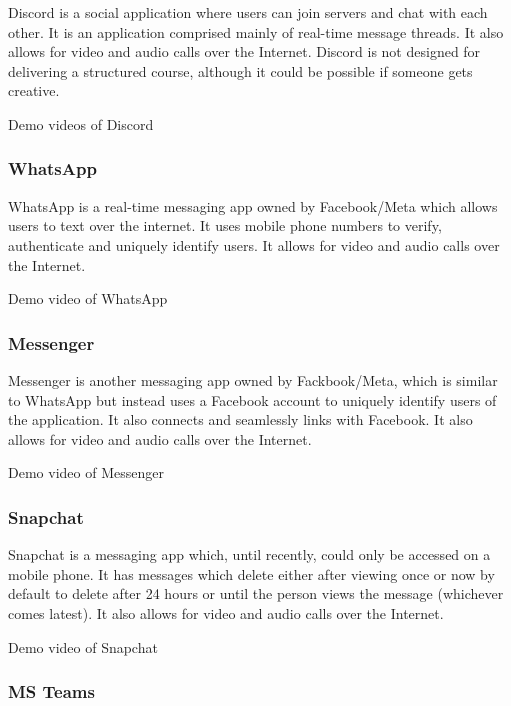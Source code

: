 Discord is a social application where users can join servers and chat with each other. It is an application comprised mainly of real-time message threads. It also allows for video and audio calls over the Internet. Discord is not designed for delivering a structured course, although it could be possible if someone gets creative.

Demo videos of Discord \cite{discord_demo_1}\cite{discord_demo_2}\cite{discord_demo_3}

\subsubsection{WhatsApp}

WhatsApp is a real-time messaging app owned by Facebook/Meta which allows users to text over the internet. It uses mobile phone numbers to verify, authenticate and uniquely identify users. It allows for video and audio calls over the Internet.

Demo video of WhatsApp \cite{WhatsApp_demo}

\subsubsection{Messenger}

Messenger is another messaging app owned by Fackbook/Meta, which is similar to WhatsApp but instead uses a Facebook account to uniquely identify users of the application. It also connects and seamlessly links with Facebook. It also allows for video and audio calls over the Internet.

Demo video of Messenger \cite{Messenger_demo}

\subsubsection{Snapchat}

Snapchat is a messaging app which, until recently, could only be accessed on a mobile phone. It has messages which delete either after viewing once or now by default to delete after 24 hours or until the person views the message (whichever comes latest). It also allows for video and audio calls over the Internet.

Demo video of Snapchat \cite{snapchat_demo}

\subsubsection{MS Teams}

